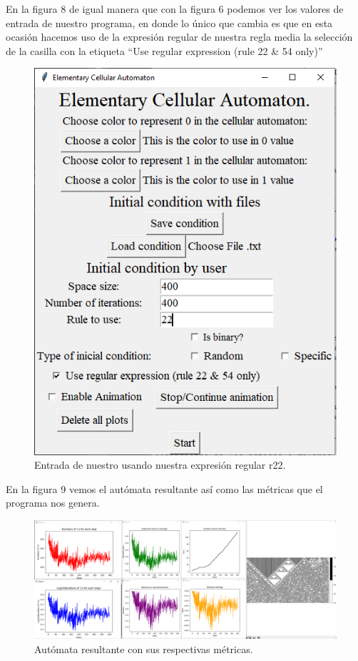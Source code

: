 \documentclass[11pt]{article}
\begin{document}
		En la figura 8 de igual manera que con la figura 6 podemos ver los valores de entrada de nuestro programa, en donde lo único que cambia es que en esta ocasión hacemos uso de la expresión regular de nuestra regla media la selección de la casilla con la etiqueta ``Use regular expression (rule 22 \& 54 only)''
		\begin{figure}[H]
			\centering
			\includegraphics[scale=0.5]{resources/RegEx22/50_prob_regex_entrada.png}
			\caption{Entrada de nuestro usando nuestra expresión regular r22.}\label{fig:picture}
		\end{figure}
		En la figura 9 vemos el autómata resultante así como las métricas que el programa nos genera.
		\begin{figure}[H]
			\includegraphics[scale=0.26]{resources/RegEx22/95_prob_regex_result.png}
			\caption{Autómata resultante con sus respectivas métricas.}\label{fig:picture}
		\end{figure}
\end{document}
